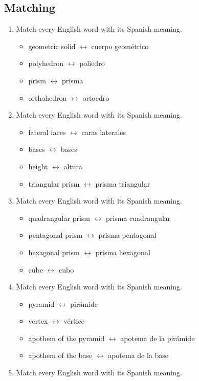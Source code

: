 \documentclass[11pt,a4paper]{article}
\begin{document}
\subsection{Matching}
\begin{enumerate}
\item Match every English word with its Spanish meaning.
\begin{itemize}
\item geometric solid $\longleftrightarrow$ cuerpo geométrico
\item polyhedron $\longleftrightarrow$ poliedro
\item prism $\longleftrightarrow$ prisma
\item orthohedron $\longleftrightarrow$ ortoedro
\end{itemize}
\item Match every English word with its Spanish meaning.
\begin{itemize}
\item lateral faces $\longleftrightarrow$ caras laterales
\item bases $\longleftrightarrow$ bases
\item height $\longleftrightarrow$ altura
\item triangular prism $\longleftrightarrow$ prisma triangular
\end{itemize}
\item Match every English word with its Spanish meaning.
\begin{itemize}
\item quadrangular prism $\longleftrightarrow$ prisma cuadrangular
\item pentagonal prism $\longleftrightarrow$ prisma pentagonal
\item hexagonal prism $\longleftrightarrow$ prisma hexagonal
\item cube $\longleftrightarrow$ cubo
\end{itemize}
\item Match every English word with its Spanish meaning.
\begin{itemize}
\item pyramid $\longleftrightarrow$ pirámide
\item vertex $\longleftrightarrow$ vértice
\item apothem of the pyramid $\longleftrightarrow$ apotema de la pirámide
\item apothem of the base $\longleftrightarrow$ apotema de la base
\end{itemize}
\item Match every English word with its Spanish meaning.

\end{enumerate}
\end{document}
